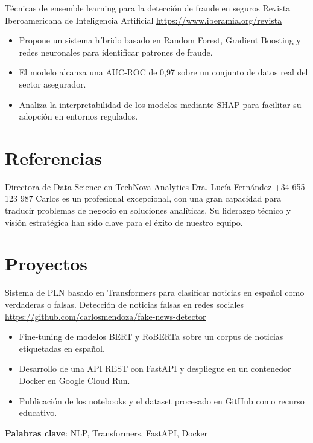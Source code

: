 \documentclass[a4paper, serif, 10pt]{moderncv}
\begin{document}
        {Técnicas de ensemble learning para la detección de fraude en seguros}
        {Revista Iberoamericana de Inteligencia Artificial}
        {\url{https://www.iberamia.org/revista}}
        {}
        {\begin{itemize}
\item Propone un sistema híbrido basado en Random Forest, Gradient Boosting y redes neuronales para identificar patrones de fraude.
\item El modelo alcanza una AUC-ROC de 0,97 sobre un conjunto de datos real del sector asegurador.
\item Analiza la interpretabilidad de los modelos mediante SHAP para facilitar su adopción en entornos regulados.
\end{itemize}}
\section{Referencias}

        {Directora de Data Science en TechNova Analytics}
        {Dra. Lucía Fernández}
        {+34 655 123 987}
        {}
        {Carlos es un profesional excepcional, con una gran capacidad para traducir problemas de negocio en soluciones analíticas. Su liderazgo técnico y visión estratégica han sido clave para el éxito de nuestro equipo.}
\section{Proyectos}

        {Sistema de PLN basado en Transformers para clasificar noticias en español como verdaderas o falsas.}
        {Detección de noticias falsas en redes sociales}
        {\url{https://github.com/carlosmendoza/fake-news-detector}}
        {}
        {\begin{itemize}
\item Fine-tuning de modelos BERT y RoBERTa sobre un corpus de noticias etiquetadas en español.
\item Desarrollo de una API REST con FastAPI y despliegue en un contenedor Docker en Google Cloud Run.
\item Publicación de los notebooks y el dataset procesado en GitHub como recurso educativo.
\end{itemize}
\textbf{Palabras clave}: NLP, Transformers, FastAPI, Docker}
\end{document}
